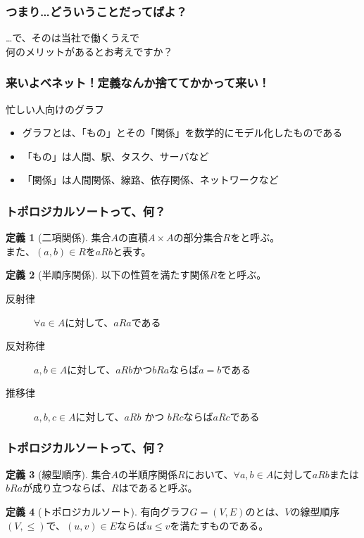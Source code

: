 \documentclass[aspectratio=169,dvipdfmx,12pt,notheorems]{beamer}
\theoremstyle{definition}
\newtheorem{definition}{定義}
\begin{document}
\begin{frame}\frametitle{つまり…どういうことだってばよ？}

\begin{center}
\Huge{…で、そのは当社で働くうえで \\ 何のメリットがあるとお考えですか？}
\end{center}

\end{frame}

\begin{frame}\frametitle{来いよベネット！定義なんか捨ててかかって来い！}

\begin{block}{忙しい人向けのグラフ}
\begin{itemize}
\item グラフとは、「もの」とその「関係」を数学的にモデル化したものである
\item 「もの」は人間、駅、タスク、サーバなど
\item 「関係」は人間関係、線路、依存関係、ネットワークなど
\end{itemize}
\end{block}

\end{frame}

\begin{frame}\frametitle{トポロジカルソートって、何？}

\begin{definition}[二項関係]
集合$A$の直積$A\times A$の部分集合$R$をと呼ぶ。 \\
また、$(a, b) \in R$を$aRb$と表す。
\end{definition}

\begin{definition}[半順序関係]
以下の性質を満たす関係$R$をと呼ぶ。
\begin{description}
\item[反射律] $\forall a \in A$に対して、$aRa$である
\item[反対称律] $a, b \in A$に対して、$aRb$かつ$bRa$ならば$a=b$である
\item[推移律] $a, b, c \in A$に対して、$aRb$ かつ $bRc$ならば$aRc$である
\end{description}
\end{definition}

\end{frame}

\begin{frame}\frametitle{トポロジカルソートって、何？}

\begin{definition}[線型順序]
集合$A$の半順序関係$R$において、$\forall a, b \in A$に対して$aRb$または$bRa$が成り立つならば、$R$はであると呼ぶ。
\end{definition}

\begin{definition}[トポロジカルソート]
有向グラフ$G=(V, E)$のとは、$V$の線型順序$(V, \leq)$で、$(u, v) \in E$ならば$u \leq v$を満たすものである。
\end{definition}

\end{frame}
\end{document}
